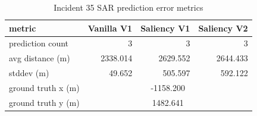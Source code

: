 \begin{table}[ht]
\centering
\caption{Incident 35 SAR prediction error metrics}
\label{tab:sar-incident-35}
\begin{tabular}{lrrr}
\hline
metric & Vanilla V1 & Saliency V1 & Saliency V2 \\
\hline
prediction count & 3 & 3 & 3 \\
avg distance (m) & 2338.014 & 2629.552 & 2644.433 \\
stddev (m) & 49.652 & 505.597 & 592.122 \\
ground truth x (m) & \multicolumn{3}{c}{-1158.200} \\
ground truth y (m) & \multicolumn{3}{c}{1482.641} \\
\hline
\end{tabular}
\end{table}
